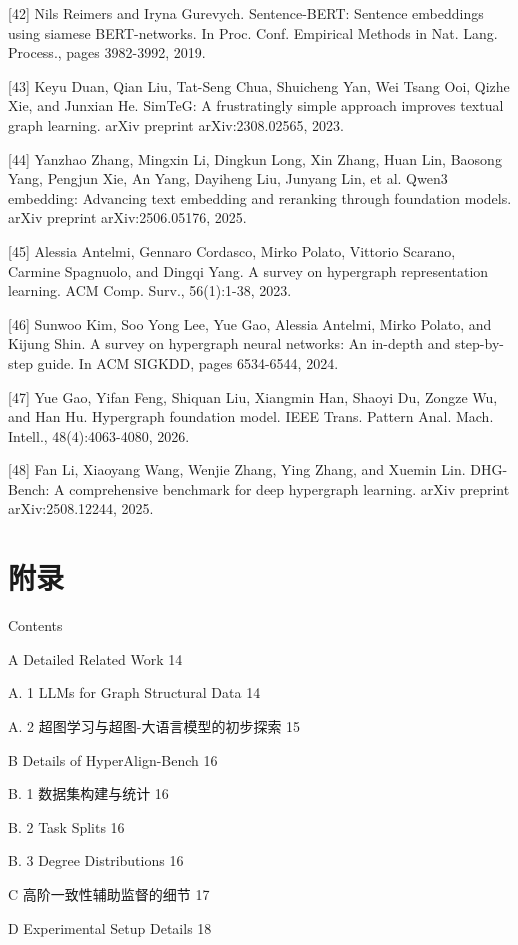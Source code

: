 \documentclass[10pt]{article}
\begin{document}
{[}42{]} Nils Reimers and Iryna Gurevych. Sentence-BERT: Sentence embeddings using siamese BERT-networks. In Proc. Conf. Empirical Methods in Nat. Lang. Process., pages 3982-3992, 2019.

{[}43{]} Keyu Duan, Qian Liu, Tat-Seng Chua, Shuicheng Yan, Wei Tsang Ooi, Qizhe Xie, and Junxian He. SimTeG: A frustratingly simple approach improves textual graph learning. arXiv preprint arXiv:2308.02565, 2023.

{[}44{]} Yanzhao Zhang, Mingxin Li, Dingkun Long, Xin Zhang, Huan Lin, Baosong Yang, Pengjun Xie, An Yang, Dayiheng Liu, Junyang Lin, et al. Qwen3 embedding: Advancing text embedding and reranking through foundation models. arXiv preprint arXiv:2506.05176, 2025.

{[}45{]} Alessia Antelmi, Gennaro Cordasco, Mirko Polato, Vittorio Scarano, Carmine Spagnuolo, and Dingqi Yang. A survey on hypergraph representation learning. ACM Comp. Surv., 56(1):1-38, 2023.

{[}46{]} Sunwoo Kim, Soo Yong Lee, Yue Gao, Alessia Antelmi, Mirko Polato, and Kijung Shin. A survey on hypergraph neural networks: An in-depth and step-by-step guide. In ACM SIGKDD, pages 6534-6544, 2024.

{[}47{]} Yue Gao, Yifan Feng, Shiquan Liu, Xiangmin Han, Shaoyi Du, Zongze Wu, and Han Hu. Hypergraph foundation model. IEEE Trans. Pattern Anal. Mach. Intell., 48(4):4063-4080, 2026.

{[}48{]} Fan Li, Xiaoyang Wang, Wenjie Zhang, Ying Zhang, and Xuemin Lin. DHG-Bench: A comprehensive benchmark for deep hypergraph learning. arXiv preprint arXiv:2508.12244, 2025.

\section*{附录}

Contents

A Detailed Related Work 14

A. 1 LLMs for Graph Structural Data 14

A. 2 超图学习与超图-大语言模型的初步探索 15

B Details of HyperAlign-Bench 16

B. 1 数据集构建与统计 16

B. 2 Task Splits 16

B. 3 Degree Distributions 16

C 高阶一致性辅助监督的细节 17

D Experimental Setup Details 18
\end{document}
